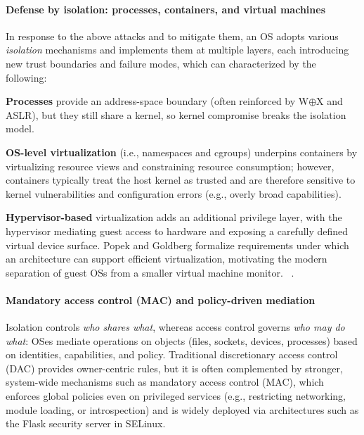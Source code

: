 \paragraph{\textbf{Defense by isolation: processes, containers, and virtual machines}}
In response to the above attacks and to mitigate them, an OS adopts various \textit{isolation} mechanisms and implements them at multiple layers, each introducing new trust boundaries and failure modes, which can characterized by the following:
\begin{myitemize}
  \item  
  \textbf{Processes} provide an address-space boundary (often reinforced by W$\oplus$X and ASLR), but they still share a kernel, so kernel compromise breaks the isolation model. 
  
  \item 
  \textbf{OS-level virtualization} (i.e., namespaces and cgroups) underpins containers by virtualizing resource views and constraining resource consumption; however, containers typically treat the host kernel as trusted and are therefore sensitive to kernel vulnerabilities and configuration errors (e.g., overly broad capabilities). 

  \item 
  \textbf{Hypervisor-based} virtualization adds an additional privilege layer, with the hypervisor mediating guest access to hardware and exposing a carefully defined virtual device surface. 
  Popek and Goldberg formalize requirements under which an architecture can support efficient virtualization, motivating the modern separation of guest OSs from a smaller virtual machine monitor\cite{popek1974formal}.
  ~.



\end{myitemize} 



\paragraph{\textbf{Mandatory access control (MAC) and policy-driven mediation}}


Isolation controls \emph{who shares what}, whereas access control governs \emph{who may do what}: OSes mediate operations on objects (files, sockets, devices, processes) based on identities, capabilities, and policy. 
Traditional discretionary access control (DAC) provides owner-centric rules, but it is often complemented by stronger, system-wide mechanisms such as mandatory access control (MAC), which enforces global policies even on privileged services (e.g., restricting networking, module loading, or introspection) and is widely deployed via architectures such as the Flask security server in SELinux\cite{spencer99flask,loscocco01selinux}.

